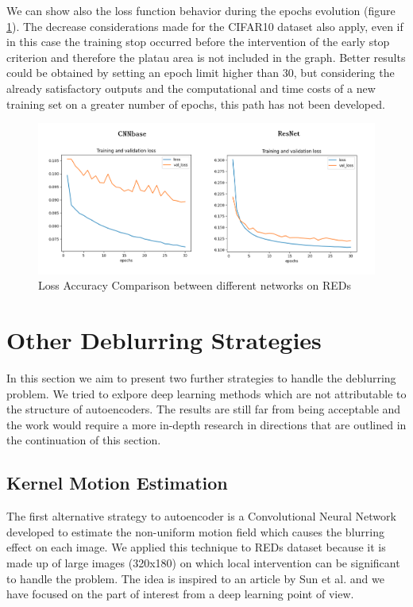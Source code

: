 \documentclass[12pt,a4paper]{report}
\begin{document}
We can show also the loss function behavior during the epochs evolution (figure \ref{Loss_accuracy_comparison_REDs}). The decrease considerations made for the CIFAR10 dataset also apply, even if in this case the training stop occurred before the intervention of the early stop criterion and therefore the platau area is not included in the graph. Better results could be obtained by setting an epoch limit higher than 30, but considering the already satisfactory outputs and the computational and time costs of a new training set on a greater number of epochs, this path has not been developed.

\begin{figure}[hptb]
\centering
\includegraphics[scale=0.4]{Loss_accuracy_comparison_REDs.png} 
\caption{Loss Accuracy Comparison between different networks on REDs}
\label{Loss_accuracy_comparison_REDs}
\end{figure}

\section{Other Deblurring Strategies}
In this section we aim to present two further strategies to handle the deblurring problem. We tried to exlpore deep learning methods which are not attributable to the structure of autoencoders. The results are still far from being acceptable and the work would require a more in-depth research in directions that are outlined in the continuation of this section.

\subsection{Kernel Motion Estimation}
The first alternative strategy to autoencoder is a Convolutional Neural Network developed to estimate the non-uniform motion field which causes the blurring effect on each image. We applied this technique to REDs dataset because it is made up of large images (320x180) on which local intervention can be significant to handle the problem. The idea is inspired to an article by Sun et al. \cite{S&Al} and we have focused on the part of interest from a deep learning point of view. 
\end{document}
